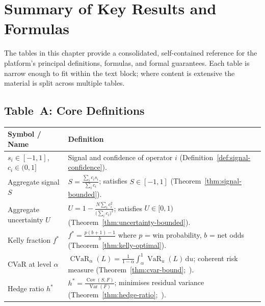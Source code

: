 \documentclass[12pt,openany]{book}
\numberwithin{equation}{chapter}
\theoremstyle{plain}
\theoremstyle{definition}
\theoremstyle{remark}
\numberwithin{equation}{chapter}
\theoremstyle{plain}
\DeclareMathOperator{\CVaR}{CVaR}
\DeclareMathOperator{\VaR}{VaR}
\DeclareMathOperator{\Var}{Var}
\DeclareMathOperator{\Cov}{Cov}
\begin{document}
\chapter*{Summary of Key Results and Formulas}
\label{ch:summary-tables}

The tables in this chapter provide a consolidated, self-contained
reference for the platform's principal definitions, formulas, and
formal guarantees.  Each table is narrow enough to fit within the
text block; where content is extensive the material is split across
multiple tables.

\section*{Table~A: Core Definitions}

\begin{center}
\begin{tabularx}{\textwidth}{@{} l X @{}}
\hline
\textbf{Symbol / Name} & \textbf{Definition} \\
\hline
$s_i \in [-1,1]$, $c_i \in (0,1]$ &
  Signal and confidence of operator $i$
  (Definition~\ref{def:signal-confidence}). \\
\addlinespace
Aggregate signal $S$ &
  $S = \displaystyle\frac{\sum_i c_i s_i}{\sum_i c_i}$; satisfies $S\in[-1,1]$
  (Theorem~\ref{thm:signal-bounded}). \\
\addlinespace
Aggregate uncertainty $U$ &
  $U = 1 - \displaystyle\frac{N\sum_i c_i^2}{\bigl(\sum_i c_i\bigr)^2}$;
  satisfies $U\in[0,1)$ (Theorem~\ref{thm:uncertainty-bounded}). \\
\addlinespace
Kelly fraction $f^*$ &
  $f^* = \displaystyle\frac{p(b+1)-1}{b}$ where $p$ = win probability,
  $b$ = net odds (Theorem~\ref{thm:kelly-optimal}). \\
\addlinespace
CVaR at level $\alpha$ &
  $\CVaR_\alpha(L) = \displaystyle\frac{1}{1-\alpha}\int_\alpha^1
  \VaR_u(L)\,\mathrm{d}u$; coherent risk measure
  (Theorem~\ref{thm:cvar-bound};~\cite{R5}). \\
\addlinespace
Hedge ratio $h^*$ &
  $h^* = \displaystyle\frac{\Cov(S,F)}{\Var(F)}$; minimises residual
  variance (Theorem~\ref{thm:hedge-ratio};~\cite{R7}). \\
\hline
\end{tabularx}
\end{center}
\end{document}
